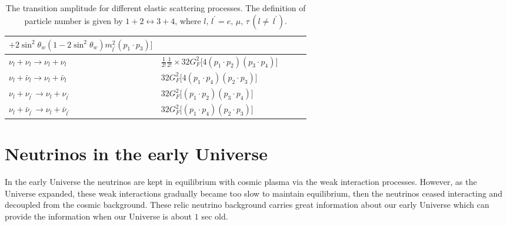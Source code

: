 \begin{table}[h]
\begin{tabular}{lp{8cm}lp{8cm}l}
   $+2\sin^2\theta_w\left(1-2\sin^2\theta_w\right)m^2_{l^\prime}\left(p_1\cdot p_3\right)\bigg]$ \\
\hline
$\nu_l+\nu_l\longrightarrow\nu_l+\nu_l$ &
$\frac{1}{2!}\frac{1}{2!}\times32G^2_F\bigg[4\left(p_1\cdot p_2\right)\left(p_3\cdot p_4\right)\bigg]$ \\
\hline
$\nu_l+\bar{\nu}_l\longrightarrow\nu_l+\bar{\nu}_l$ &
$32G^2_F\bigg[4\left(p_1\cdot p_4\right)\left(p_2\cdot p_3\right)\bigg]$ \\
\hline
$\nu_l+\nu_{l^\prime}\longrightarrow\nu_l+\nu_{l^\prime}$ &
$32G^2_F\bigg[\left(p_1\cdot p_2\right)\left(p_3\cdot p_4\right)\bigg]$ \\
\hline
$\nu_l+\bar{\nu}_{l^\prime}\longrightarrow\nu_l+\bar{\nu}_{l^\prime}$ &
$32G^2_F\bigg[\left(p_1\cdot p_4\right)\left(p_2\cdot p_3\right)\bigg]$ \\
\hline\hline
\end{tabular}
\caption{The transition amplitude for different elastic scattering processes. The definition of particle number is given by $1+2\leftrightarrow3+4$, where $l,\,l^\prime=e,\,\mu,\,\tau\,(l\neq\,l^\prime)$.}
\label{T006}
\end{table}

\clearpage


\section{Neutrinos in the early Universe }
In the early Universe the neutrinos are kept in equilibrium with cosmic plasma via the weak interaction processes. However, as the Universe expanded, these weak interactions gradually became too slow to maintain equilibrium, then the neutrinos ceased interacting and decoupled from the cosmic background. These relic neutrino background carries great information about our early Universe which can provide the information when our Universe is about $1$ sec old. 

